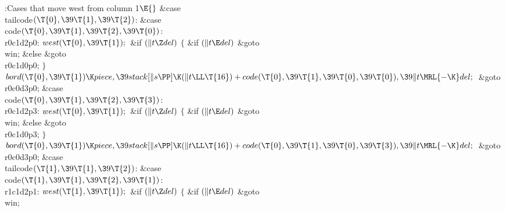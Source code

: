 \B{}:Cases that move west from column 1\X${}\E{}$%
\6
\4\&{case} \\{tailcode}${}(\T{0},\39\T{1},\39\T{2}){}$:\5
\&{case} \\{code}${}(\T{0},\39\T{1},\39\T{2},\39\T{0}){}$:\5
\\{r0c1d2p0}:\5
${}\\{west}(\T{0},\39\T{1});{}$\6
\&{if} ${}(\|t\Z\\{del}){}$\5
${}\{{}$\5
\1\&{if} ${}(\|t\E\\{del}){}$\1\5
\&{goto} \\{win};\5
\2\&{else}\1\5
\&{goto} \\{r0c1d0p0};\5
\2${}\}{}$\2\6
${}\\{bord}(\T{0},\39\T{1})\K\\{piece},\39\\{stack}[\|s\PP]\K(\|t\LL\T{16})+%
\\{code}(\T{0},\39\T{1},\39\T{0},\39\T{0}),\39\|t\MRL{-{\K}}\\{del};{}$\6
\&{goto} \\{r0c0d3p0};\6
\4\&{case} \\{code}${}(\T{0},\39\T{1},\39\T{2},\39\T{3}){}$:\5
\\{r0c1d2p3}:\5
${}\\{west}(\T{0},\39\T{1});{}$\6
\&{if} ${}(\|t\Z\\{del}){}$\5
${}\{{}$\5
\1\&{if} ${}(\|t\E\\{del}){}$\1\5
\&{goto} \\{win};\5
\2\&{else}\1\5
\&{goto} \\{r0c1d0p3};\5
\2${}\}{}$\2\6
${}\\{bord}(\T{0},\39\T{1})\K\\{piece},\39\\{stack}[\|s\PP]\K(\|t\LL\T{16})+%
\\{code}(\T{0},\39\T{1},\39\T{0},\39\T{3}),\39\|t\MRL{-{\K}}\\{del};{}$\6
\&{goto} \\{r0c0d3p0};\6
\4\&{case} \\{tailcode}${}(\T{1},\39\T{1},\39\T{2}){}$:\5
\&{case} \\{code}${}(\T{1},\39\T{1},\39\T{2},\39\T{1}){}$:\5
\\{r1c1d2p1}:\5
${}\\{west}(\T{1},\39\T{1});{}$\6
\&{if} ${}(\|t\Z\\{del}){}$\5
${}\{{}$\5
\1\&{if} ${}(\|t\E\\{del}){}$\1\5
\&{goto} \\{win};\5
